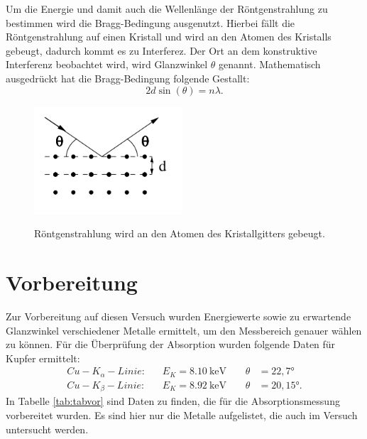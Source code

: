 Um die Energie und damit auch die Wellenlänge der Röntgenstrahlung zu bestimmen wird die
Bragg-Bedingung ausgenutzt. Hierbei fällt die Röntgenstrahlung auf einen Kristall und wird an den
Atomen des Kristalls gebeugt, dadurch kommt es zu Interferez. Der Ort an dem konstruktive
Interferenz beobachtet wird, wird Glanzwinkel $\theta$ genannt.
Mathematisch ausgedrückt hat die Bragg-Bedingung folgende Gestallt:
\begin{equation}
  2d\sin(\theta)=n\lambda.
  \label{eqn:bragg}
\end{equation}

\begin{figure}
  \centering
  \includegraphics[height=4cm]{bragg.png}
  \caption{Röntgenstrahlung wird an den Atomen des Kristallgitters gebeugt.}
  \label{fig:bragg}
  \cite{skript}
\end{figure}

\section{Vorbereitung}

Zur Vorbereitung auf diesen Versuch wurden Energiewerte sowie zu erwartende Glanzwinkel verschiedener
Metalle ermittelt, um den Messbereich genauer wählen zu können.
Für die Überprüfung der Absorption wurden folgende Daten für Kupfer ermittelt:
\begin{align*}
  Cu-K_{\alpha}-Linie:& \;\;\;E_K=\SI{8,10}{\keV}\;\;\;\;&\theta &=22,7°\\
  Cu-K_{\beta}-Linie:& \;\;\;E_K=\SI{8,92}{\keV}\;\;\;\;&\theta &=20,15°.
\end{align*}
In Tabelle \ref{tab:tabvor} sind Daten zu finden, die für die Absorptionsmessung
vorbereitet wurden. Es sind hier nur die Metalle aufgelistet, die auch im Versuch
untersucht werden.

